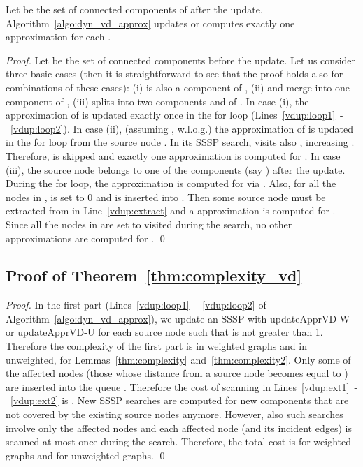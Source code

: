 \documentclass[english]{llncs}
\newcommand{\vd}{\xspace}
\newcommand{\upvd}{\textsf{updateApprVD-W}\xspace}
\newcommand{\upvdu}{\textsf{updateApprVD-U}\xspace}
\begin{document}
\begin{lemma}
\label{thm:dyn_vd_correctness}
Let  be the set of connected components of  after the update. Algorithm~\ref{algo:dyn_vd_approx} updates or computes exactly one \vd approximation for each .
\end{lemma}
\begin{proof}
Let  be the set of connected components before the update. Let us consider three basic cases (then it is straightforward to see that the proof holds also for combinations of these cases): (i)  is also a component of , (ii)  and  merge into one component  of , (iii)  splits into two components  and  of . In case (i), the \vd approximation of  is updated exactly once in the for loop (Lines~\ref{vdup:loop1}~-~\ref{vdup:loop2}). In case (ii), (assuming , w.l.o.g.) the \vd approximation of  is updated in the for loop from the source node . In its SSSP search,  visits also , increasing . Therefore,  is skipped and exactly one \vd approximation is computed for . In case (iii), the source node  belongs to one of the components (say ) after the update. During the for loop, the \vd approximation is computed for  via . Also, for all the nodes  in ,  is set to 0 and  is inserted into . Then some source node  must be extracted from  in Line~\ref{vdup:extract} and a \vd approximation is computed for . Since all the nodes in  are set to visited during the search, no other \vd approximations are computed for .
 \qed
\end{proof}



\subsection{Proof of Theorem~\ref{thm:complexity_vd}}
\label{sub:proof_complexity_vd}
\begin{proof}
In the first part (Lines~\ref{vdup:loop1}~-~\ref{vdup:loop2} of Algorithm~\ref{algo:dyn_vd_approx}), we update an SSSP with \upvd or \upvdu for each source node  such that  is not greater than 1. Therefore the complexity of the first part is  in weighted graphs and  in unweighted, for Lemmas~\ref{thm:complexity} and~\ref{thm:complexity2}. Only some of the affected nodes (those whose distance from a source node becomes equal to ) are inserted into the queue . Therefore the cost of scanning  in Lines~\ref{vdup:ext1}~-~\ref{vdup:ext2} is . New SSSP searches are computed for new components that are not covered by the existing source nodes anymore. However, also such searches involve only the affected nodes and each affected node (and its incident edges) is scanned at most once during the search. Therefore, the total cost is  for weighted graphs and  for unweighted graphs. \qed
\end{proof}
\end{document}
